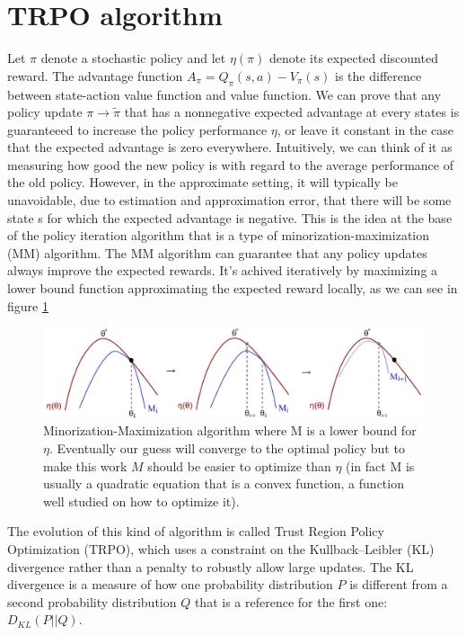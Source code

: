 \documentclass[11pt]{article}
\begin{document}
\section{TRPO algorithm}\label{section-trpo}
Let $\pi$ denote a stochastic policy and let $\eta(\pi)$ denote its expected discounted reward. The
advantage function $A_{\pi} = Q_{\pi}(s, a) - V_{\pi}(s)$ is the difference between state-action
value function and value function. We can prove that any policy update $\pi \rightarrow \tilde{\pi}$
that has a nonnegative expected advantage at every states is guaranteeed to increase the policy
performance $\eta$, or leave it constant in the case that the expected advantage is zero everywhere.
Intuitively, we can think of it as measuring how good the new policy is with regard to the average
performance of the old policy. However, in the approximate setting, it will typically be
unavoidable, due to estimation and approximation error, that there will be some state s for which
the expected advantage is negative. This is the idea at the base of the policy iteration algorithm
that is a type of minorization-maximization (MM) algorithm. 
The MM algorithm can guarantee that any policy updates always improve the expected
rewards. It's achived iteratively by maximizing a lower bound function approximating the
expected reward locally, as we can see in figure \ref{fig:functions1}
\begin{figure}[t]
        \includegraphics[width=15cm]{functions1}
        \centering
        \caption{Minorization-Maximization algorithm where M is a lower bound for $\eta$.
                Eventually our guess will converge to the optimal policy but to make this
                work $M$ should be easier to optimize than $\eta$ (in fact M is usually a
                quadratic equation that is a convex function, a function well studied on
                how to optimize it). }
        \label{fig:functions1}
\end{figure}

The evolution of this kind of algorithm is called Trust Region Policy Optimization (TRPO),
which uses a constraint on the Kullback–Leibler (KL) divergence rather than a penalty to
robustly allow large updates. The KL divergence is a measure of how one probability
distribution $P$ is different from a second probability distribution $Q$ that is a
reference for the first one: $D_{KL}(P||Q)$.
\end{document}

